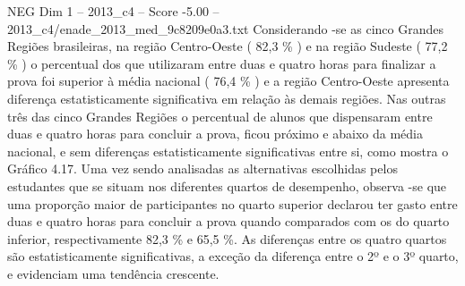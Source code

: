 \begin{textsample}{NEG Dim 1 – 2013\_c4 – Score -5.00 – 2013\_c4/enade\_2013\_med\_9c8209e0a3.txt}
Considerando -se as cinco Grandes Regiões brasileiras, na região Centro-Oeste ( 82,3 \% ) e na região Sudeste ( 77,2 \% ) o percentual dos que utilizaram entre duas e quatro horas para finalizar a prova foi superior à média nacional ( 76,4 \% ) e a região Centro-Oeste apresenta diferença estatisticamente significativa em relação às demais regiões.
Nas outras três das cinco Grandes Regiões o percentual de alunos que dispensaram entre duas e quatro horas para concluir a prova, ficou próximo e abaixo da média nacional, e sem diferenças estatisticamente significativas entre si, como mostra o Gráfico 4.17.
Uma vez sendo analisadas as alternativas escolhidas pelos estudantes que se situam nos diferentes quartos de desempenho, observa -se que uma proporção maior de participantes no quarto superior declarou ter gasto entre duas e quatro horas para concluir a prova quando comparados com os do quarto inferior, respectivamente 82,3 \% e 65,5 \%.
As diferenças entre os quatro quartos são estatisticamente significativas, a exceção da diferença entre o 2º e o 3º quarto, e evidenciam uma tendência crescente.

\end{textsample}
